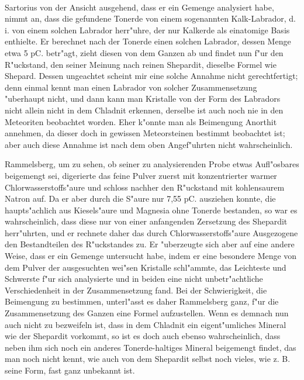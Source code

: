 \documentclass[a4paper, 11pt, oneside, german]{article}
\begin{document}
\paragraph{}
Sartorius von der Ansicht ausgehend, dass er ein Gemenge analysiert habe, nimmt an, dass die gefundene Tonerde von einem sogenannten Kalk-Labrador, d. i. von einem solchen Labrador herr"uhre, der nur Kalkerde als einatomige Basis enthielte. Er berechnet nach der Tonerde einen solchen Labrador, dessen Menge etwa 5 pC. betr"agt, zieht diesen von dem Ganzen ab und findet nun f"ur den R"uckstand, den seiner Meinung nach reinen Shepardit, dieselbe Formel wie Shepard. Dessen ungeachtet scheint mir eine solche Annahme nicht gerechtfertigt; denn einmal kennt man einen Labrador von solcher Zusammensetzung "uberhaupt nicht, und dann kann man Kristalle von der Form des Labradors nicht allein nicht in dem Chladnit erkennen, derselbe ist auch noch nie in den Meteoriten beobachtet worden. Eher k"onnte man als Beimengung Anorthit annehmen, da dieser doch in gewissen Meteorsteinen bestimmt beobachtet ist; aber auch diese Annahme ist nach dem oben Angef"uhrten nicht wahrscheinlich.

Rammelsberg, um zu sehen, ob seiner zu analysierenden Probe etwas Aufl"osbares beigemengt sei, digerierte das feine Pulver zuerst mit konzentrierter warmer Chlorwasserstoffs"aure und schloss nachher den R"uckstand mit kohlensaurem Natron auf. Da er aber durch die S"aure nur 7,55 pC. ausziehen konnte, die haupts"achlich aus Kiesels"aure und Magnesia ohne Tonerde bestanden, so war es wahrscheinlich, dass diese nur von einer anfangenden Zersetzung des Shepardit herr"uhrten, und er rechnete daher das durch Chlorwasserstoffs"aure Ausgezogene den Bestandteilen des R"uckstandes zu. Er "uberzeugte sich aber auf eine andere Weise, dass er ein Gemenge untersucht habe, indem er eine besondere Menge von dem Pulver der ausgesuchten wei"sen Kristalle schl"ammte, das Leichteste und Schwerste f"ur sich analysierte und in beiden eine nicht unbetr"achtliche Verschiedenheit in der Zusammensetzung fand. Bei der Schwierigkeit, die Beimengung zu bestimmen, unterl"asst es daher Rammelsberg ganz, f"ur die Zusammensetzung des Ganzen eine Formel aufzustellen. Wenn es demnach nun auch nicht zu bezweifeln ist, dass in dem Chladnit ein eigent"umliches Mineral wie der Shepardit vorkommt, so ist es doch auch ebenso wahrscheinlich, dass neben ihm sich noch ein anderes Tonerde-haltiges Mineral beigemengt findet, das man noch nicht kennt, wie auch von dem Shepardit selbst noch vieles, wie z. B. seine Form, fast ganz unbekannt ist.
\end{document}
